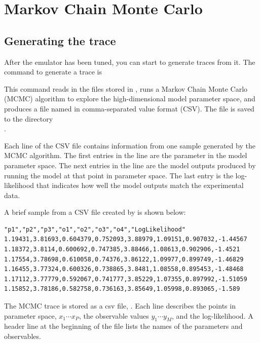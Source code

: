 \section{Markov Chain Monte Carlo}\label{sec:mcmc}

\subsection{Generating the trace}\label{subsec:GeneratingTheTrace}

After the emulator has been tuned, you can start to generate traces from it. The command to generate a trace is


This command reads in the files stored in , runs a Markov Chain Monte Carlo (MCMC) algorithm to explore the high-dimensional model parameter space, and produces a file named  in comma-separated value format (CSV). The  file is saved to the directory \\.

Each line of the CSV file contains information from one sample generated by the MCMC algorithm. The first entries in the line are the parameter in the model parameter space. The next entries in the line are the model outputs produced by running the model at that point in parameter space. The last entry is the log-likelihood that indicates how well the model outputs match the experimental data.

A brief sample from a CSV file created by   is shown below:

\begin{verbatim}
"p1","p2","p3","o1","o2","o3","o4","LogLikelihood"
1.19431,3.81693,0.604379,0.752093,3.88979,1.09151,0.907032,-1.44567
1.18372,3.8114,0.600692,0.747385,3.88466,1.08613,0.902906,-1.4521
1.17554,3.78698,0.610058,0.74376,3.86122,1.09977,0.899749,-1.46829
1.16455,3.77324,0.600326,0.738865,3.8481,1.08558,0.895453,-1.48468
1.17112,3.77779,0.592067,0.741777,3.85229,1.07355,0.897992,-1.51059
1.15852,3.78186,0.582758,0.736163,3.85649,1.05998,0.893065,-1.589
\end{verbatim}

The MCMC trace is stored as a csv file, . Each line describes the points in parameter space, $x_1\cdots x_P$, the observable values $y_1\cdots y_M$, and the log-likelihood. A header line at the beginning of the file lists the names of the parameters and observables.

